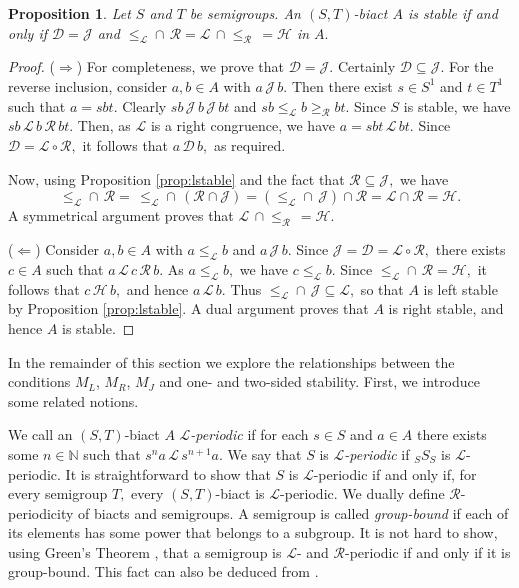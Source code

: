 \documentclass[twoside,a4paper,12pt,reqno]{amsart}
\theoremstyle{plain}
\newtheorem{lem}[thm]{Lemma}
\newtheorem{prop}[thm]{Proposition}
\theoremstyle{definition}
\renewcommand{\l}{\mbox{${\mathcal{L}}$}}
\renewcommand{\r}{\mbox{${\mathcal{R}}$}}
\newcommand{\h}{\mbox{${\mathcal{H}}$}}
\renewcommand{\d}{\mbox{${\mathcal{D}}$}}
\renewcommand{\j}{\mbox{${\mathcal{J}}$}}
\newcommand{\leql}{\leq_{\mathcal{L}}}
\newcommand{\leqr}{\leq_{\mathcal{R}}}
\newcommand{\geqr}{\geq_{\mathcal{R}}}
\renewcommand{\S}{{_S}\hspace{-0.1em}}
\newcommand{\N}{\mathbb{N}}
\begin{document}
\begin{prop}
Let $S$ and $T$ be semigroups.  An $(S,T)$-biact $A$ is stable if and only if $\d=\j$ and $\leql\cap\,\r=\l\,\cap\leqr\,=\h$ in $A.$
\end{prop}

\begin{proof}
($\Rightarrow$) For completeness, we prove that $\d=\j.$  Certainly $\d\subseteq\j.$  For the reverse inclusion, consider $a,b\in A$ with $a\,\j\,b.$  Then there exist $s\in S^1$ and $t\in T^1$ such that $a=sbt.$  Clearly $sb\,\j\,b\,\j\,bt$ and $sb\leql b\geqr bt.$  Since $S$ is stable, we have $sb\,\l\,b\,\r\,bt.$  Then, as $\l$ is a right congruence, we have $a=sbt\,\l\,bt.$  Since $\d=\l\circ\r,$ it follows that $a\,\d\,b,$ as required.

Now, using Proposition \ref{prop:lstable} and the fact that $\r\subseteq\j,$ we have
$$\leql\cap\,\r=\,\leql\cap\,(\r\cap\j)=(\leql\cap\,\j)\cap\r=\l\cap\r=\h.$$
A symmetrical argument proves that $\l\,\cap\leqr\,=\h.$

($\Leftarrow$) Consider $a,b\in A$ with $a\leql b$ and $a\,\j\,b.$  Since $\j=\d=\l\circ\r,$ there exists $c\in A$ such that $a\,\l\,c\,\r\,b.$  As $a\leql b,$ we have $c\leql b.$  Since $\leql\cap\,\r=\h,$ it follows that $c\,\h\,b,$ and hence $a\,\l\,b.$  Thus $\leql\cap\,\j\subseteq\l,$ so that $A$ is left stable by Proposition \ref{prop:lstable}.  A dual argument proves that $A$ is right stable, and hence $A$ is stable.
\end{proof}

In the remainder of this section we explore the relationships between the conditions $M_L$, $M_R$, $M_J$ and one- and two-sided stability.  First, we introduce some related notions.

We call an $(S,T)$-biact $A$ {\em$\l$-periodic} if for each $s\in S$ and $a\in A$ there exists some $n\in\N$ such that $s^na\,\l\,s^{n+1}a$.  We say that $S$ is {\em $\l$-periodic} if ${_S}S_S$ is $\l$-periodic.  It is straightforward to show that $S$ is $\l$-periodic if and only if, for every semigroup $T,$ every $(S,T)$-biact is $\l$-periodic.
We dually define $\r$-periodicity of biacts and semigroups.  A semigroup is called {\em group-bound} if each of its elements has some power that belongs to a subgroup.  
It is not hard to show, using Green's Theorem \cite[Theorem 2.16]{Clifford:1961}, that a semigroup is $\l$- and $\r$-periodic if and only if it is group-bound.  This fact can also be deduced from \cite[Theorems 4 and 7]{Drazin}.
\end{document}
